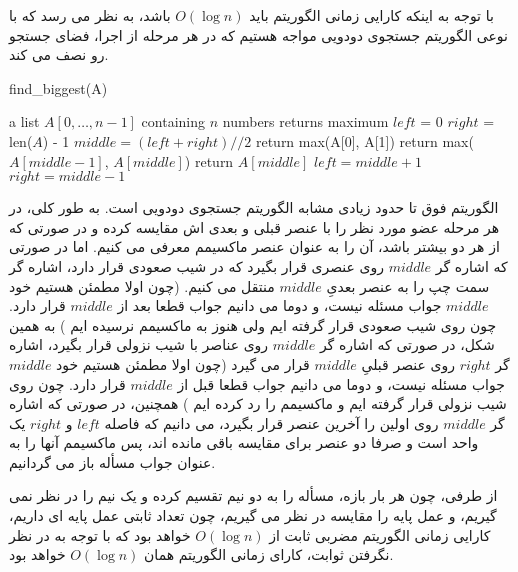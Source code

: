 \documentclass{article}
\begin{document}
با توجه به اینکه کارایی زمانی الگوریتم باید
$O(\log n)$
باشد، به نظر می رسد که با نوعی الگوریتم جستجوی دودویی مواجه
هستیم که در هر مرحله از اجرا، فضای جستجو رو نصف می کند.

\begin{latin}
    \begin{algorithm}[H]
        \caption*{find\_biggest(A)}
        \begin{algorithmic}
            \Require a list $A[0, \ldots, n-1]$ containing $n$ numbers
            \Ensure returns maximum
            \State $left$ = 0
            \State $right$ = len($A$) - 1
                $middle = (left + right) // 2$
                    \State return max(A[0], A[1])
                    \State return max($A[middle - 1]$, $A[middle]$)
                    \State return $A[middle]$
                    \State $left = middle + 1$
                    \State $right = middle - 1$
                \EndIf
            \EndWhile
        \end{algorithmic}
    \end{algorithm}
\end{latin}

الگوریتم فوق تا حدود زیادی مشابه الگوریتم جستجوی دودویی است.
به طور کلی، در هر مرحله عضو مورد نظر را با عنصر قبلی و بعدی اش مقایسه
کرده و در صورتی که از هر دو بیشتر باشد، آن را به عنوان عنصر ماکسیمم
معرفی می کنیم.
اما در صورتی که اشاره گر
$middle$
روی عنصری قرار بگیرد که در شیب صعودی قرار دارد،
اشاره گر سمت چپ را به عنصر بعدیِ
$middle$
منتقل می کنیم.
(چون اولا مطمئن هستیم خود
$middle$
جواب مسئله نیست، و دوما می دانیم جواب قطعا بعد از
$middle$
قرار دارد. چون روی شیب صعودی قرار گرفته ایم ولی هنوز به
ماکسیمم نرسیده ایم
)
به همین شکل، در صورتی که اشاره گر
$middle$
روی عناصر با شیب نزولی قرار بگیرد، اشاره گر
$right$
روی عنصر قبلیِ
$middle$
قرار می گیرد
(چون اولا مطمئن هستیم خود
$middle$
جواب مسئله نیست، و دوما می دانیم جواب قطعا قبل از
$middle$
قرار دارد. چون روی شیب نزولی قرار گرفته ایم و ماکسیمم را رد کرده ایم
)
همچنین، در صورتی که اشاره گر
$middle$
روی اولین را آخرین عنصر قرار بگیرد، می دانیم که فاصله
$left$
و
$right$
یک واحد است و صرفا دو عنصر برای مقایسه باقی مانده اند، پس ماکسیمم آنها
را به عنوان جواب مسأله باز می گردانیم.

از طرفی، چون هر بار بازه، مسأله را به دو نیم تقسیم کرده و یک نیم را
در نظر نمی گیریم، و عمل پایه را مقایسه در نظر می گیریم،
چون تعداد ثابتی عمل پایه ای داریم، کارایی زمانی الگوریتم مضربی ثابت از
$O(\log n)$
خواهد بود که با توجه به در نظر نگرفتن ثوابت، کارای زمانی الگوریتم همان
$O(\log n)$
خواهد بود.
\end{document}
